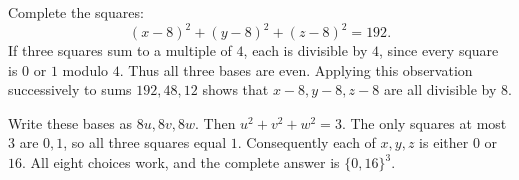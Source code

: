 Complete the squares:
\[
(x-8)^2+(y-8)^2+(z-8)^2=192.
\]
If three squares sum to a multiple of $4$, each is divisible by $4$, since every square is $0$ or $1$ modulo $4$. Thus all three bases are even. Applying this observation successively to sums $192,48,12$ shows that $x-8,y-8,z-8$ are all divisible by $8$.

Write these bases as $8u,8v,8w$. Then $u^2+v^2+w^2=3$. The only squares at most $3$ are $0,1$, so all three squares equal $1$. Consequently each of $x,y,z$ is either $0$ or $16$. All eight choices work, and the complete answer is $\boxed{\{0,16\}^3}$.
